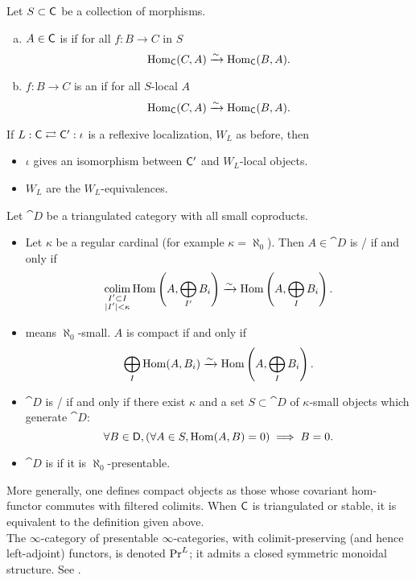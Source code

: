 \begin{definition}
Let $S\subset \mathsf{C}$ be a collection of morphisms.
\begin{enumerate}[a)]
\item $A\in \mathsf{C}$ is  if for all $f:B\to C$ in $S$
\[
\operatorname{Hom}_\mathsf{C}(C,A) \xrightarrow{\sim} \operatorname{Hom}_\mathsf{C}(B,A).
\]
\item $f:B\to C$ is an  if for all $S$-local $A$
\[
\operatorname{Hom}_{\mathsf{C}}(C,A) \xrightarrow{\sim} \operatorname{Hom}_\mathsf{C}(B,A).
\]
\end{enumerate}
\end{definition}
\begin{lemma}
If $L:\mathsf{C} \rightleftarrows \mathsf{C}':\iota$ is a reflexive localization, $W_L$ as before, then
\begin{itemize}
\item $\iota$ gives an isomorphism between $\mathsf{C}'$ and $W_L$-local objects.
\item $W_L$ are the $W_L$-equivalences.
\end{itemize}
\end{lemma}
\begin{definition}
Let $\cat{D}$ be a triangulated category with all small coproducts.
\begin{itemize}
\item Let $\kappa$ be a regular cardinal (for example $\kappa=\aleph_0$). Then $A\in
\cat{D}$ is / if and only if
\[
\operatorname*{colim}_{\substack{I' \subset I \\ |I'|<\kappa}} \operatorname{Hom}\left( A,\bigoplus_{I'}B_i \right)
\xrightarrow{\sim} \operatorname{Hom}\left( A, \bigoplus_I B_i \right)
.\]
\item {} means $\aleph_0$-small. $A$ is compact if and only if
\[
\bigoplus_I \operatorname{Hom}(A,B_i) \xrightarrow{\sim} \operatorname{Hom} \left( A,\bigoplus_{I}B_i \right)
.\]
\item $\cat{D}$ is / if and only if there exist
$\kappa$ and a set $S\subset \cat{D}$ of $\kappa$-small objects which generate $\cat{D}$:
\[
\forall B\in \mathsf{D},\left( \forall A\in S, \operatorname{Hom}(A,B)=0 \right) \implies B = 0
.\]
\item $\cat{D}$ is  if it is $\aleph_0$-presentable.
\end{itemize}
\end{definition}

\begin{remark}
More generally, one defines compact objects as those whose covariant
hom-functor commutes with filtered colimits. When $\mathsf{C}$ is triangulated or
stable, it is equivalent to the definition given above.\\
The $\infty$-category of presentable $\infty$-categories, with colimit-preserving (and
hence left-adjoint) functors, is denoted $\operatorname{Pr}^L$; it admits a closed symmetric monoidal
structure. See \cite[\S 5.5]{htt}.
\end{remark}

